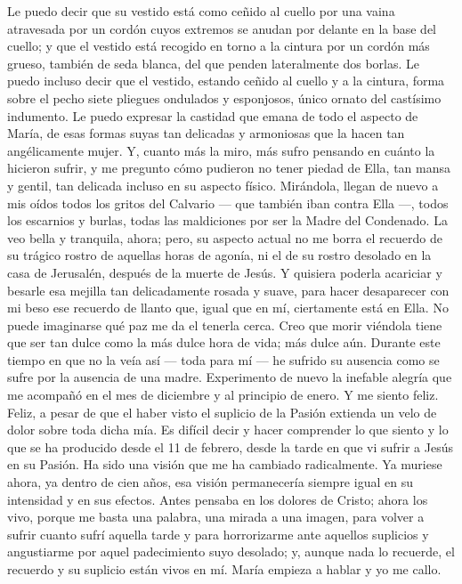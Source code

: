 \documentclass[12pt]{book} %
\begin{document}
Le puedo decir que su vestido está como ceñido al cuello por una vaina atravesada por un cordón cuyos extremos se 
anudan por delante en la base del cuello; y que el vestido está recogido en torno a la cintura por un cordón más grueso, también de seda blanca, del que penden lateralmente dos borlas. 
Le puedo incluso decir que el vestido, estando ceñido al cuello y a la cintura, forma sobre el pecho siete pliegues ondulados y esponjosos, único ornato del castísimo indumento. 
Le puedo expresar la castidad que emana de todo el aspecto de María, de esas formas suyas tan delicadas y armoniosas que la hacen tan angélicamente mujer. 
Y, cuanto más la miro, más sufro pensando en cuánto la hicieron sufrir, y me pregunto cómo pudieron no tener piedad 
de Ella, tan mansa y gentil, tan delicada incluso en su aspecto físico. Mirándola, llegan de nuevo a mis oídos todos los gritos del Calvario — que también iban contra Ella —, todos los escarnios y burlas, todas las maldiciones por ser la Madre del Condenado. La veo bella y tranquila, ahora; pero, su aspecto actual no me borra el recuerdo de su trágico rostro de aquellas horas de agonía, ni el de su rostro desolado en la casa de Jerusalén, después de la muerte de Jesús. Y quisiera poderla acariciar y besarle esa mejilla tan delicadamente rosada y suave, para hacer desaparecer con mi beso ese recuerdo de llanto que, igual que en mí, ciertamente está en Ella. 
No puede imaginarse qué paz me da el tenerla cerca. Creo que morir viéndola tiene que ser tan dulce como la más dulce hora de vida; más dulce aún. Durante este tiempo en que no la veía así — toda para mí — he sufrido su ausencia como se sufre por la ausencia de una madre. Experimento de nuevo la inefable alegría que me acompañó en el mes de diciembre y al principio de enero. Y me siento feliz. Feliz, a pesar de que el haber visto el suplicio de la Pasión extienda un velo de dolor sobre toda dicha mía. 
Es difícil decir y hacer comprender lo que siento y lo que se ha producido desde el 11 de febrero, desde la tarde en que 
vi sufrir a Jesús en su Pasión. Ha sido una visión que me ha cambiado radicalmente. Ya muriese ahora, ya dentro de cien años, esa visión permanecería siempre igual en su intensidad y en sus efectos. Antes pensaba en los dolores de Cristo; ahora los vivo, porque me basta una palabra, una mirada a una imagen, para volver a sufrir cuanto sufrí aquella tarde y para horrorizarme ante aquellos suplicios y angustiarme por aquel padecimiento suyo desolado; y, aunque nada lo recuerde, el recuerdo y su suplicio están vivos en mí. 
María empieza a hablar y yo me callo. 
\end{document}
